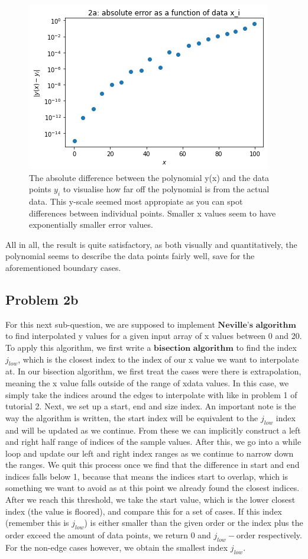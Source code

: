 \begin{figure}[h!]
  \centering
  \includegraphics[width=0.6\linewidth]{problem2a2.png}
  \caption{The absolute difference between the polynomial y(x) and the data points $y_i$ to visualise how far off the polynomial is from the actual data. This y-scale seemed most appropiate as you can spot differences between individual points. Smaller x values seem to have exponentially smaller error values.}
  \label{fig:fig2}
\end{figure}

All in all, the result is quite satisfactory, as both visually and quantitatively, the polynomial seems to describe the data points fairly well, save for the aforementioned boundary cases. 

\subsection{Problem 2b}

For this next sub-question, we are supposed to implement $\textbf{Neville's algorithm}$ to find interpolated y values for a given input array of x values between 0 and 20. To apply this algorithm, we first write a $\textbf{bisection algorithm}$ to find the index $j_{low}$, which is the closest index to the index of our x value we want to interpolate at. In our bisection algorithm, we first treat the cases were there is extrapolation, meaning the x value falls outside of the range of xdata values. In this case, we simply take the indices around the edges to interpolate with like in problem 1 of tutorial 2. Next, we set up a start, end and size index. An important note is the way the algorithm is written, the start index will be equivalent to the $j_{low}$ index and will be updated as we continue. From these we can implicitly construct a left and right half range of indices of the sample values. After this, we go into a while loop and update our left and right index ranges as we continue to narrow down the ranges. We quit this process once we find that the difference in start and end indices falls below 1, because that means the indices start to overlap, which is something we want to avoid as at this point we already found the closest indices. After we reach this threshold, we take the start value, which is the lower closest index (the value is floored), and compare this for a set of cases. If this index (remember this is $j_{low}$) is either smaller than the given order or the index plus the order exceed the amount of data points, we return 0 and $j_{low} - \text{order}$ respectively. For the non-edge cases however, we obtain the smallest index $j_{low}$.\\

